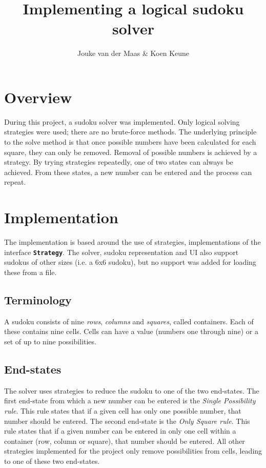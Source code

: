 \documentclass[11pt, a4paper, fleqn]{article}
\title{Implementing a logical sudoku solver}
\author{Jouke van der Maas \& Koen Keune}
\newcommand{\class}[1]{{\color{class}\textbf{\lstinline{#1}}}}
\begin{document}
\maketitle

\section{Overview}
During this project, a sudoku solver was implemented. Only
logical solving strategies were used; there are no brute-force methods.
The underlying principle to the solve method is that once
possible numbers have been calculated for each square, they can only be removed.
Removal of possible numbers is achieved by a strategy.
By trying strategies repeatedly, one of two states can always be achieved. From these
states, a new number can be entered and the process can repeat.

\section{Implementation}
The implementation is based around the use of strategies, implementations of the interface
\class{Strategy}.
The solver, sudoku representation and UI also support sudokus of other sizes (i.e. a 6x6
sudoku), but no support was added for loading these from a file.

\subsection{Terminology}
A sudoku consists of nine \emph{rows}, \emph{columns} and \emph{squares}, called containers. Each of these
contains nine cells. Cells can have a value (numbers one through nine) or a set of up to nine possibilities.

\subsection{End-states}
The solver uses strategies to reduce the sudoku to one of the two end-states.
The first end-state from which a new number can be entered is the 
\emph{Single Possibility rule}. This rule states that if a given cell has only one
possible number, that number should be entered. The second end-state is the \emph{%
Only Square rule}. This rule states that if a given number can be entered in only one
cell within a container (row, column or square), that number should be entered. All
other strategies implemented for the project only remove possibilities from cells, leading
to one of these two end-states.
\end{document}
